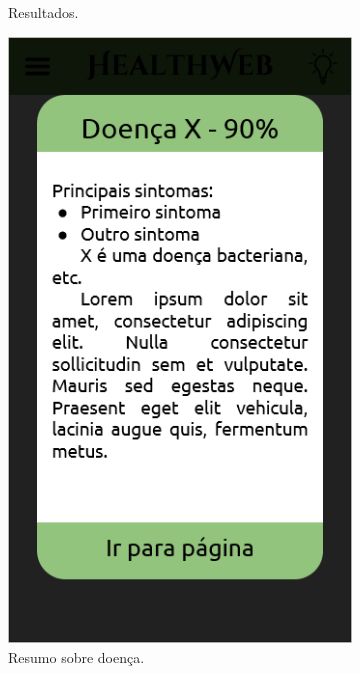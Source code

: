 \begin{figure}[htbp]
\begin{subfigure}{0.24\linewidth}
		\caption{Resultados.}
		\label{fig:mobile:results}
	\end{subfigure}
	\hfill
	\begin{subfigure}{0.24\linewidth}
		\centering
		\includegraphics[width=\linewidth]{figure/prototype/mobile/this_disease.png}
		\caption{Resumo sobre doença.}
		\label{fig:mobile:this_disease}
	\end{subfigure}
	\hfill
	\begin{subfigure}{0.24\linewidth}
		\centering

\end{subfigure}
\end{figure}
